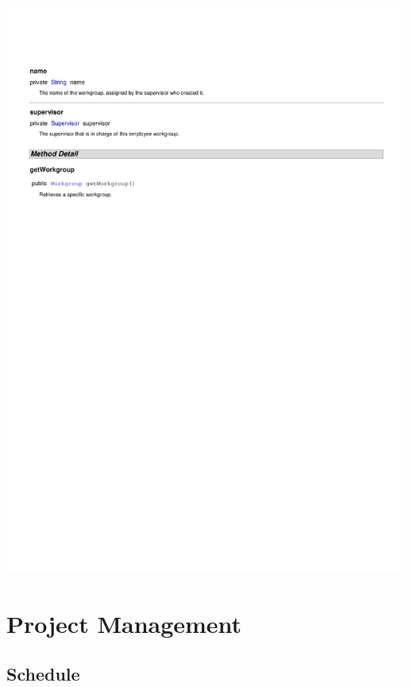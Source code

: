 \documentclass[letterpaper,12pt]{report}
\begin{document}
\includegraphics[scale=0.9,trim=20mm 30mm 25mm 25mm]{externals/ProblemDomainDataDictionary16.pdf}
\newpage





\part{Project Management}

\chapter{Schedule}
\end{document}

